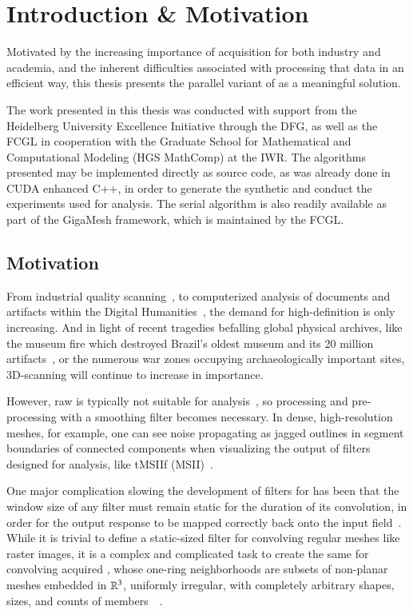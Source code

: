 \chapter{Introduction \& Motivation}
\label{ch1}
Motivated by the increasing importance of \tdd{} acquisition for both industry and academia, and the inherent difficulties associated with processing that data in an efficient way, this thesis presents the parallel variant of  as a meaningful solution.

The work presented in this thesis was conducted with support from the Heidelberg University Excellence Initiative through the DFG, as well as the \gls{FCGL} in cooperation with the Graduate School for Mathematical and Computational Modeling (HGS MathComp) at the \gls{IWR}. The algorithms presented may be implemented directly as source code, as was already done in CUDA enhanced C++, in order to generate the synthetic \tdd{} and conduct the experiments used for analysis. The serial algorithm is also readily available as part of the GigaMesh framework, which is maintained by the \gls{FCGL}.

%
%
%
%
%
%
\section{Motivation}
From industrial quality scanning~\cite{ILATO14}, to computerized analysis of documents and artifacts within the Digital Humanities~\cite{Bogacz15}, the demand for high-definition \tdd{} is only increasing. And in light of recent tragedies befalling global physical archives, like the museum fire which destroyed Brazil's oldest museum and its 20 million artifacts~\cite{Andreoni18}, or the numerous war zones occupying archaeologically important sites, 3D-scanning will continue to increase in importance.

However, raw \tdd{} is typically not suitable for analysis~\cite[p.~25-32]{Mara12}, so processing and pre-processing with a smoothing filter becomes necessary. In dense, high-resolution meshes, for example, one can see noise propagating as jagged outlines in segment boundaries of connected components when visualizing the output of filters designed for analysis, like \acrlong{tMSIIf} (MSII)~\cite[s.~3.2]{Mara17}.

One major complication slowing the development of filters for \tdd{} has been that the window size of any filter must remain static for the duration of its convolution, in order for the output response to be mapped correctly back onto the input field~\cite[p.~106-112]{Jaehne97}. While it is trivial to define a static-sized filter for convolving regular meshes like raster images, it is a complex and complicated task to create the same for convolving acquired \tdd{}, whose one-ring neighborhoods are subsets of non-planar meshes embedded in $\mathbb{R}^{3}$, uniformly irregular, with completely arbitrary shapes, sizes, and counts of members~\cite[p.~29]{Mara12}~\cite[s.~3.2]{Mara17}.

